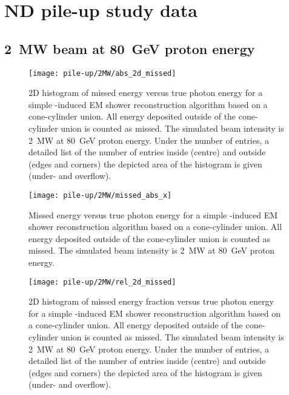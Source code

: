 \chapter{\dune{} ND pile-up study data}
\label{chap:pile-up-data}

\section{\SI{2}{\mega\watt} beam at \SI{80}{\giga\electronvolt} proton energy}

\begin{figure}[htb]
	\centering
	\texttt{[image: pile-up/2MW/abs\_2d\_missed]}
	\caption{2D histogram of missed energy versus true photon energy for a simple \Pgpz-induced EM shower reconstruction algorithm based on a cone-cylinder union.
		All energy deposited outside of the cone-cylinder union is counted as missed.
		The simulated beam intensity is \SI{2}{\mega\watt} at \SI{80}{\giga\electronvolt} proton energy.
		Under the number of entries, a detailed list of the number of entries inside (centre) and outside (edges and corners) the depicted area of the histogram is given (under- and overflow).}
\end{figure}

\begin{figure}[htb]
	\centering
	\texttt{[image: pile-up/2MW/missed\_abs\_x]}
	\caption{Missed energy versus true photon energy for a simple \Pgpz-induced EM shower reconstruction algorithm based on a cone-cylinder union.
		All energy deposited outside of the cone-cylinder union is counted as missed.
		The simulated beam intensity is \SI{2}{\mega\watt} at \SI{80}{\giga\electronvolt} proton energy.}
\end{figure}

\begin{figure}[htb]
	\centering
	\texttt{[image: pile-up/2MW/rel\_2d\_missed]}
	\caption{2D histogram of missed energy fraction versus true photon energy for a simple \Pgpz-induced EM shower reconstruction algorithm based on a cone-cylinder union.
		All energy deposited outside of the cone-cylinder union is counted as missed.
		The simulated beam intensity is \SI{2}{\mega\watt} at \SI{80}{\giga\electronvolt} proton energy.
		Under the number of entries, a detailed list of the number of entries inside (centre) and outside (edges and corners) the depicted area of the histogram is given (under- and overflow).}
\end{figure}

